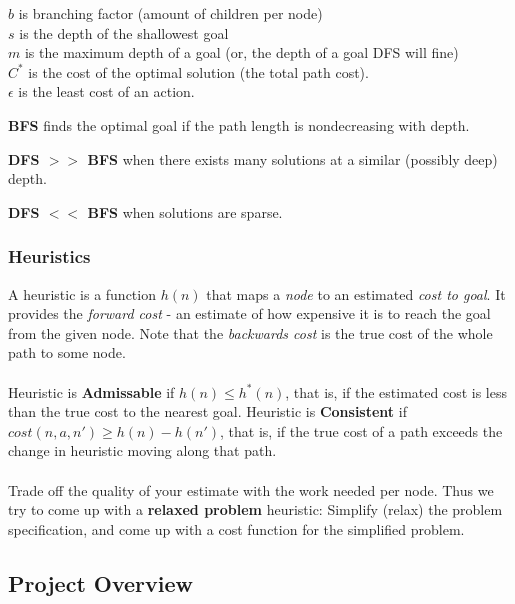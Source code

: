 \documentclass[]{article}
\begin{document}
$b$ is branching factor (amount of children per node)\\
$s$ is the depth of the shallowest goal\\
$m$ is the maximum depth of a goal (or, the depth of a goal DFS will fine)\\
$C^*$ is the cost of the optimal solution (the total path cost). \\
$\epsilon$ is the least cost of an action.

\textbf{BFS} finds the optimal goal if the path length is nondecreasing with depth.

\textbf{DFS $>>$ BFS} when there exists many solutions at a similar (possibly deep) depth.

\textbf{DFS $<<$ BFS} when solutions are sparse.

\subsubsection{Heuristics}

A heuristic is a function $h(n)$ that maps a \emph{node} to an estimated \emph{cost to goal}. It provides the \emph{forward cost} - an estimate of how expensive it is to reach the goal from the given node. Note that the \emph{backwards cost} is the true cost of the whole path to some node.

\paragraph{}

Heuristic is \textbf{Admissable} if $h(n) \leq h^*(n)$, that is, if the estimated cost is less than the true cost to the nearest goal. Heuristic is \textbf{Consistent} if $cost(n, a, n') \geq h(n) - h(n')$, that is, if the true cost of a path exceeds the change in heuristic moving along that path.

\paragraph{}

Trade off the quality of your estimate with the work needed per node. Thus we try to come up with a \textbf{relaxed problem} heuristic: Simplify (relax) the problem specification, and come up with a cost function for the simplified problem.

\subsection{Project Overview}
\end{document}
